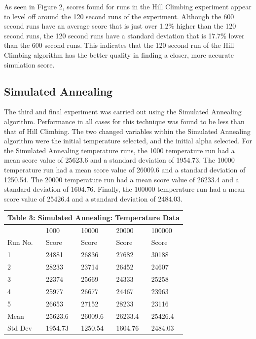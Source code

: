 \documentclass[10pt, twocolumn]{article}
\begin{document}
As seen in Figure 2, scores found for runs in the Hill Climbing experiment appear to
level off around the 120 second runs of the experiment. Although the 600 second runs have
an average score that is just over 1.2\% higher than the 120 second runs, the 120 second runs
have a standard deviation that is 17.7\% lower than the 600 second runs. This indicates
that the 120 second run of the Hill Climbing algorithm has the better quality in finding
a closer, more accurate simulation score.

\subsection{Simulated Annealing}
The third and final experiment was carried out using the Simulated Annealing algorithm.
Performance in all cases for this technique was found to be less than that of Hill Climbing.
The two changed variables within the Simulated Annealing algorithm were the initial
temperature selected, and the initial alpha selected. For the Simulated Annealing
temperature runs, the 1000 temperature run had a mean score value of 25623.6 and
a standard deviation of 1954.73. The 10000 temperature run had a mean score value
of 26009.6 and a standard deviation of 1250.54. The 20000 temperature run had a
mean score value of 26233.4 and a standard deviation of 1604.76. Finally, the
100000 temperature run had a mean score value of 25426.4 and a standard deviation
of 2484.03.

\bigbreak
\begin{tabular}{ |p{1.3cm}||p{1.2cm}|p{1.2cm}|p{1.2cm}|p{1.2cm}|  }
 \hline
 \multicolumn{5}{|c|}{Table 3: Simulated Annealing: Temperature Data} \\
 \hline
     & 1000 & 10000 & 20000 & 100000\\
 \hline
  Run No. & Score & Score & Score & Score\\
 \hline
   1 & 24881 &	26836 &	27682 &	30188\\
   2 & 28233 &	23714	& 26452	& 24607\\
   3 & 22374 &	25669	& 24333	& 25258\\
   4 & 25977 &	26677	& 24467	& 23963\\
   5 & 26653 &	27152	& 28233	& 23116\\
 \hline
 Mean & 25623.6	& 26009.6&	26233.4&	25426.4\\
 \hline
 Std Dev& 1954.73 &	1250.54 &	1604.76 &	2484.03\\
 \hline
\end{tabular}
\bigbreak
\end{document}
